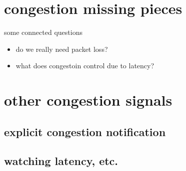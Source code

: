 \section{congestion missing pieces}
\begin{frame}{some connected questions}
    \begin{itemize}
    \item do we really need packet loss?
    \item what does congestoin control due to latency?
    \end{itemize}
\end{frame}

\section{other congestion signals}



\subsection{explicit congestion notification}



\subsection{watching latency, etc.}




